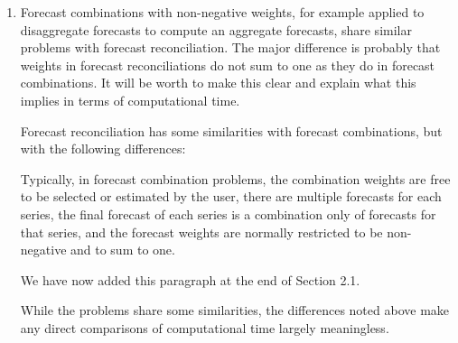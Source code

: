 \documentclass[10pt,a4paper]{article}
\begin{document}
\begin{enumerate}
\item
  Forecast combinations with non-negative weights, for example applied to disaggregate forecasts to compute an aggregate forecasts, share similar problems with forecast reconciliation. The major difference is probably that weights in forecast reconciliations do not sum to one as they do in forecast combinations. It will be worth to make this clear and explain what this implies in terms of computational time.

  {\color{blue} Forecast reconciliation has some similarities with forecast combinations, but with the following differences:  Typically, in forecast combination problems, the combination weights are free to be selected or estimated by the user, there are multiple forecasts for each series, the final forecast of each series is a combination only of forecasts for that series, and the forecast weights are normally restricted to be non-negative and to sum to one.

  We have now added this paragraph at the end of Section 2.1.

  While the problems share some similarities, the differences noted above make any direct comparisons of computational time largely meaningless.



}
\end{enumerate}
\end{document}
